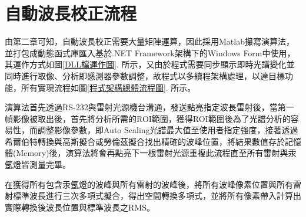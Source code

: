 \titlespacing{\chapter}{0cm}{-2cm}{0cm}
\chapter{自動波長校正流程}

由第二章可知，自動波長校正需要大量矩陣運算，因此採用Matlab攥寫演算法，並打包成動態函式庫匯入基於.NET Framework架構下的Windows Form中使用，其運作方式如圖\ref{DLL檔運作圖}. 所示，又由於程式需要同步顯示即時光譜變化並同時進行取像、分析即感測器參數調整，故程式以多續程架構處理，以達目標功能，所有實現流程如圖\ref{程式架構總體流程圖}. 所示。\par
演算法首先透過RS-232與雷射光源機台溝通，發送點亮指定波長雷射後，當第一幀影像被取出後，首先將分析所需的ROI範圍，獲得ROI範圍後為了光譜分析的容易性，而調整影像參數，即Auto Scaling光譜最大值至使用者指定強度，接著透過希爾伯特轉換與高斯擬合或勞倫茲擬合找出精確的波峰位置，將結果數值存於記憶體(Memory)後，演算法將會再點亮下一根雷射光源重複此流程直至所有雷射與汞氬燈皆測量完畢。\par
在獲得所有包含汞氬燈的波峰與所有雷射的波峰後，將所有波峰像素位置與所有雷射標準波長進行三次多項式擬合，得出空間轉換多項式，並將所有像素帶入計算出實際轉換後波長位置與標準波長之RMS。

